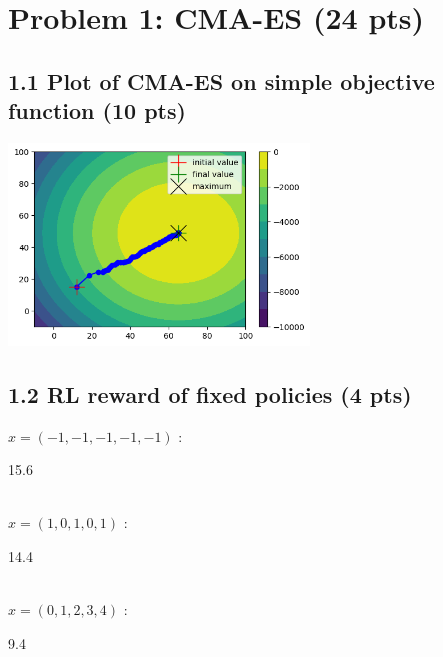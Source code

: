\documentclass[12pt]{article}
\begin{document}
\section*{Problem 1: CMA-ES (24 pts)}
\subsection*{1.1 Plot of CMA-ES on simple objective function (10 pts)}
\begin{tcolorbox}[fit,height=30em, width=40em, blank, borderline={1pt}{1pt},nobeforeafter]
            \begin{center}
                 \vspace*{5em}
                   \centering
                    \includegraphics[width=0.6\textwidth]{visuals/CMA-ES_Simple.png}
            \end{center}
            \end{tcolorbox}
            
\subsection*{1.2 RL reward of fixed policies (4 pts)}

$x = (-1, -1, -1, -1, -1)$ : \begin{tcolorbox}[fit,height=1cm, width=5cm, blank, borderline={1pt}{1pt},nobeforeafter]
    \begin{center}
    \vspace{3mm}
    \large{15.6}
    \end{center}
\end{tcolorbox} \\
$x = (1, 0, 1, 0, 1)$ : \hspace{3.5em} \begin{tcolorbox}[fit,height=1cm, width=5cm, blank, borderline={1pt}{1pt},nobeforeafter]
    \begin{center}
    \vspace{3mm}
    \large{14.4}
    \end{center}
\end{tcolorbox} \\
$x = (0, 1, 2, 3, 4)$ : \hspace{3.5em} \begin{tcolorbox}[fit,height=1cm, width=5cm, blank, borderline={1pt}{1pt},nobeforeafter]
    \begin{center}
    \vspace{3mm}
    \large{9.4}
    \end{center}
\end{tcolorbox}
\end{document}

